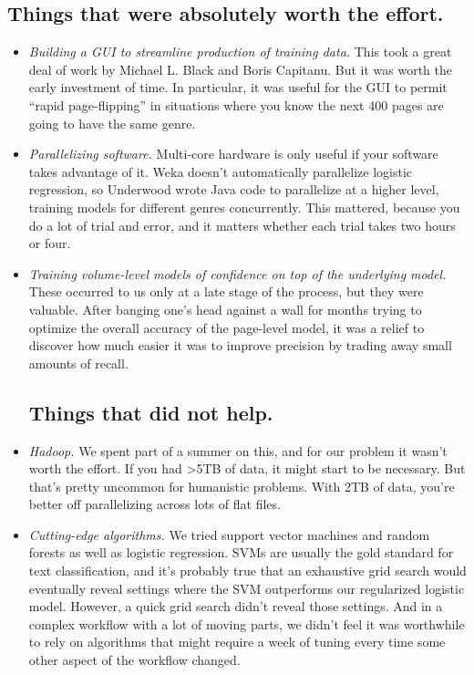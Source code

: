 \documentclass[paper=a4, fontsize=12pt]{scrartcl}
\numberwithin{equation}{section}		%
\numberwithin{figure}{section}			%
\numberwithin{table}{section}				%
\begin{document}
\subsection{Things that were absolutely worth the effort.}
\begin{itemize}

\item \textit{Building a GUI to streamline production of training data.} This took a great deal of work by Michael L. Black and Boris Capitanu. But it was worth the early investment of time. In particular, it was useful for the GUI to permit ``rapid page-flipping'' in situations where you know the next 400 pages are going to have the same genre.

\item \textit{Parallelizing software.} Multi-core hardware is only useful if your software takes advantage of it. Weka doesn't automatically parallelize logistic regression, so Underwood wrote Java code to parallelize at a higher level, training models for different genres concurrently. This mattered, because you do a lot of trial and error, and it matters whether each trial takes two hours or four.

\item \textit{Training volume-level models of confidence on top of the underlying model.} These occurred to us only at a late stage of the process, but they were valuable. After banging one's head against a wall for months trying to optimize the overall accuracy of the page-level model, it was a relief to discover how much easier it was to improve precision by trading away small amounts of recall.

\subsection{Things that did not help.}

\item \textit{Hadoop.} We spent part of a summer on this, and for our problem it wasn't worth the effort. If you had >5TB of data, it might start to be necessary. But that's pretty uncommon for humanistic problems. With 2TB of data, you're better off parallelizing across lots of flat files.

\item \textit{Cutting-edge algorithms.} We tried support vector machines and random forests as well as logistic regression. SVMs are usually the gold standard for text classification, and it's probably true that an exhaustive grid search would eventually reveal settings where the SVM outperforms our regularized logistic model. However, a quick grid search didn't reveal those settings. And in a complex workflow with a lot of moving parts, we didn't feel it was worthwhile to rely on algorithms that might require a week of tuning every time some other aspect of the workflow changed.


\end{itemize}
\end{document}
